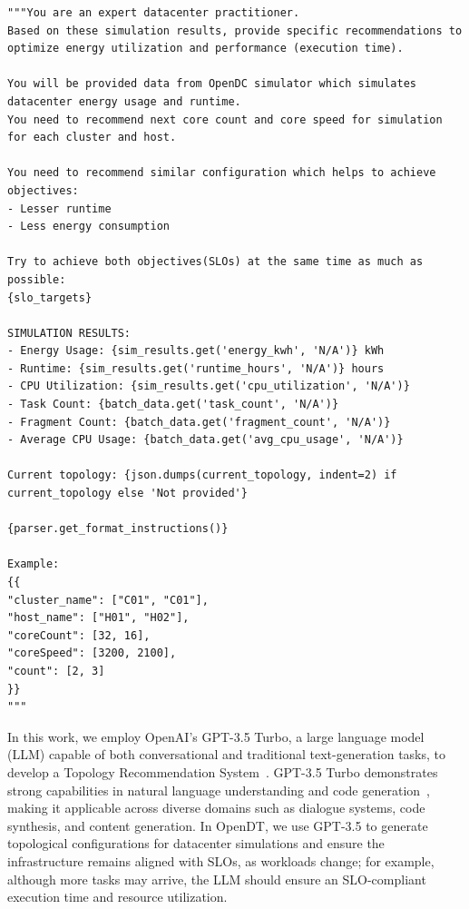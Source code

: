 \begin{lstlisting}[style=pyopendt,
  caption={OpenDT LLM prompt to request SLO-aligned topology changes.},
  label={lst:opendt-prompt},
  captionpos=b, % put caption below
  float=!htbp  % let it float like figures
]
"""You are an expert datacenter practitioner. 
Based on these simulation results, provide specific recommendations to optimize energy utilization and performance (execution time).

You will be provided data from OpenDC simulator which simulates datacenter energy usage and runtime.
You need to recommend next core count and core speed for simulation for each cluster and host.

You need to recommend similar configuration which helps to achieve objectives:
- Lesser runtime
- Less energy consumption

Try to achieve both objectives(SLOs) at the same time as much as possible:
{slo_targets}

SIMULATION RESULTS:
- Energy Usage: {sim_results.get('energy_kwh', 'N/A')} kWh
- Runtime: {sim_results.get('runtime_hours', 'N/A')} hours
- CPU Utilization: {sim_results.get('cpu_utilization', 'N/A')}
- Task Count: {batch_data.get('task_count', 'N/A')}  
- Fragment Count: {batch_data.get('fragment_count', 'N/A')}
- Average CPU Usage: {batch_data.get('avg_cpu_usage', 'N/A')}

Current topology: {json.dumps(current_topology, indent=2) if current_topology else 'Not provided'}

{parser.get_format_instructions()}

Example:
{{
"cluster_name": ["C01", "C01"],
"host_name": ["H01", "H02"],
"coreCount": [32, 16],
"coreSpeed": [3200, 2100],
"count": [2, 3]
}}
"""
\end{lstlisting}

In this work, we employ OpenAI’s GPT-3.5 Turbo, a large language model (LLM) capable of both conversational and traditional text-generation tasks, to develop a Topology Recommendation System~. 
GPT-3.5 Turbo demonstrates strong capabilities in natural language understanding and code generation~, making it applicable across diverse domains such as dialogue systems, code synthesis, and content generation. 
In OpenDT, we use GPT-3.5 to generate topological configurations for datacenter simulations and ensure the infrastructure remains aligned with SLOs, as workloads change; 
for example, although more tasks may arrive, the LLM should ensure an SLO-compliant execution time and resource utilization.



